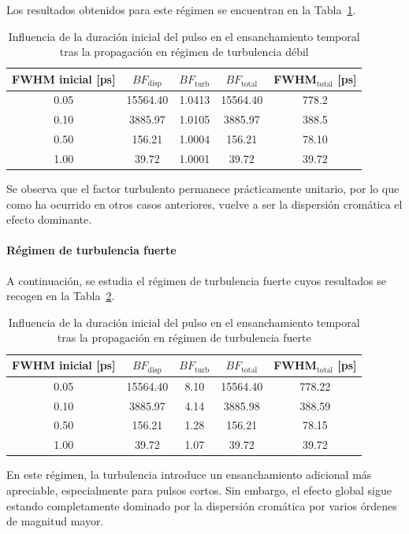 Los resultados obtenidos para este régimen se encuentran en la Tabla~\ref{tabla_oceano_duracion_debil}.

\begin{table}[H]
\centering
\hspace*{-0.6cm}
\renewcommand{\arraystretch}{1.2}
\begin{tabular}{|c|c|c|c|c|}
\hline
\textbf{FWHM inicial [ps]} &
\textbf{$BF_{\mathrm{disp}}$} &
\textbf{$BF_{\mathrm{turb}}$} &
\textbf{$BF_{\mathrm{total}}$} &
\textbf{FWHM$_{\mathrm{total}}$ [ps]} \\
\hline
0.05 & 15564.40 & 1.0413 & 15564.40 & 778.2 \\
0.10 & 3885.97 & 1.0105 & 3885.97 & 388.5 \\
0.50 & 156.21 & 1.0004 & 156.21 & 78.10 \\
1.00 & 39.72 & 1.0001 & 39.72 & 39.72 \\
\hline
\end{tabular}
\caption{Influencia de la duración inicial del pulso en el ensanchamiento temporal tras la propagación en régimen de turbulencia débil}
\label{tabla_oceano_duracion_debil}
\end{table}
 
Se observa que el factor turbulento permanece prácticamente unitario, por lo que como ha ocurrido en otros casos anteriores, vuelve a ser la dispersión cromática el efecto dominante.

\paragraph{Régimen de turbulencia fuerte}

A continuación, se estudia el régimen de turbulencia fuerte cuyos resultados se recogen en la Tabla~\ref{tabla_oceano_duracion_fuerte}.

\begin{table}[H]
\centering
\hspace*{-0.6cm}
\renewcommand{\arraystretch}{1.2}
\begin{tabular}{|c|c|c|c|c|}
\hline
\textbf{FWHM inicial [ps]} &
\textbf{$BF_{\mathrm{disp}}$} &
\textbf{$BF_{\mathrm{turb}}$} &
\textbf{$BF_{\mathrm{total}}$} &
\textbf{FWHM$_{\mathrm{total}}$ [ps]} \\
\hline
0.05 & 15564.40 & 8.10 & 15564.40 & 778.22 \\
0.10 & 3885.97 & 4.14 & 3885.98 & 388.59 \\
0.50 & 156.21 & 1.28 & 156.21 & 78.15 \\
1.00 & 39.72 & 1.07 & 39.72 & 39.72 \\
\hline
\end{tabular}
\caption{Influencia de la duración inicial del pulso en el ensanchamiento temporal tras la propagación en régimen de turbulencia fuerte}
\label{tabla_oceano_duracion_fuerte}
\end{table}


En este régimen, la turbulencia introduce un ensanchamiento adicional más apreciable, especialmente para pulsos cortos. Sin embargo, el efecto global sigue estando completamente dominado por la dispersión cromática por varios órdenes de magnitud mayor.
